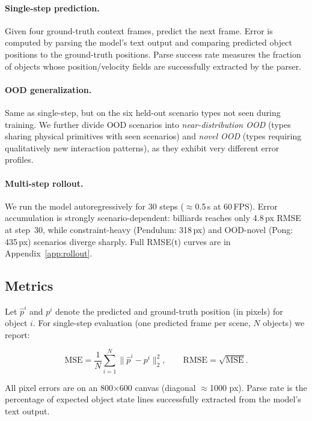 \documentclass{article}
\begin{document}
\paragraph{Single-step prediction.}
Given four ground-truth context frames, predict the next frame. Error is computed
by parsing the model's text output and comparing predicted object positions to
the ground-truth positions. Parse success rate measures the fraction of objects
whose position/velocity fields are successfully extracted by the parser.

\paragraph{OOD generalization.}
Same as single-step, but on the six held-out scenario types not seen during
training. We further divide OOD scenarios into \emph{near-distribution OOD}
(types sharing physical primitives with seen scenarios) and \emph{novel OOD}
(types requiring qualitatively new interaction patterns), as they exhibit very
different error profiles.

\paragraph{Multi-step rollout.}
We run the model autoregressively for 30 steps ($\approx$0.5\,s at 60\,FPS).
Error accumulation is strongly scenario-dependent: billiards reaches only
4.8\,px RMSE at step~30, while constraint-heavy (Pendulum: 318\,px) and
OOD-novel (Pong: 435\,px) scenarios diverge sharply. Full RMSE(t) curves
are in Appendix~\ref{app:rollout}.

\subsection{Metrics}

Let $\hat{p}^i$ and $p^i$ denote the predicted and ground-truth position
(in pixels) for object $i$. For single-step evaluation (one predicted frame per
scene, $N$ objects) we report:

\begin{equation}
\text{MSE} = \frac{1}{N}\sum_{i=1}^{N}\bigl\|\hat{p}^i - p^i\bigr\|_2^2,
\qquad \text{RMSE} = \sqrt{\text{MSE}}.
\end{equation}

All pixel errors are on an 800$\times$600 canvas (diagonal $\approx$1000 px).
Parse rate is the percentage of expected object state lines successfully
extracted from the model's text output.
\end{document}

